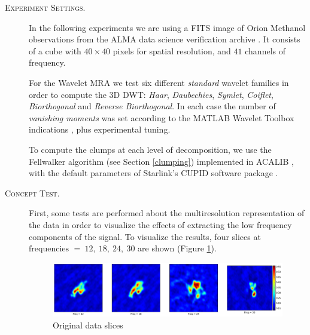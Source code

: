 \documentclass[letter, 11pt]{article}
\begin{document}
\begin{description}
    \item[\textsc{Experiment Settings.}] In the following experiments we are using a FITS image of Orion Methanol observations from the ALMA data science verification archive \footnotemark[1]. It consists of a cube with $40 \times 40$ pixels for spatial resolution, and $41$ channels of frequency.

    For the Wavelet MRA we test six different \textit{standard} wavelet families in order to compute the 3D DWT: \textit{Haar}, \textit{Daubechies}, \textit{Symlet}, \textit{Coiflet}, \textit{Biorthogonal} and \textit{Reverse Biorthogonal}. In each case the number of \textit{vanishing moments}  was set according to the MATLAB Wavelet Toolbox indications \footnotemark[2], plus experimental tuning.    

    To compute the clumps at each level of decomposition, we use the Fellwalker algorithm (see Section \ref{clumping}) implemented in ACALIB \footnotemark[3], with the default parameters of Starlink's CUPID software package \footnotemark[4].


    \item[\textsc{Concept Test.}]
     First, some tests are performed about the multiresolution representation of the data in order to visualize the effects of extracting the low frequency components of the signal. To visualize the results, four slices at $\text{frequencies }= \ 12,\ 18,\ 24,\ 30$ are shown (Figure \ref{fig:level0}).
    \begin{figure}[htpb!]
    \centering
    \includegraphics[width=15cm]{level0}
    \caption{Original data slices}
    \label{fig:level0}
    \end{figure}


\end{description}
\end{document}
